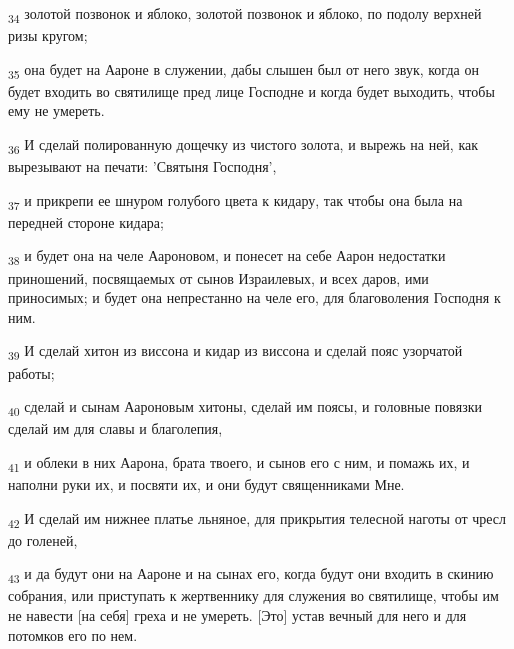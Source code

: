 \begin{tcolorbox}
\textsubscript{34} золотой позвонок и яблоко, золотой позвонок и яблоко, по подолу верхней ризы кругом;
\end{tcolorbox}
\begin{tcolorbox}
\textsubscript{35} она будет на Аароне в служении, дабы слышен был от него звук, когда он будет входить во святилище пред лице Господне и когда будет выходить, чтобы ему не умереть.
\end{tcolorbox}
\begin{tcolorbox}
\textsubscript{36} И сделай полированную дощечку из чистого золота, и вырежь на ней, как вырезывают на печати: 'Святыня Господня',
\end{tcolorbox}
\begin{tcolorbox}
\textsubscript{37} и прикрепи ее шнуром голубого цвета к кидару, так чтобы она была на передней стороне кидара;
\end{tcolorbox}
\begin{tcolorbox}
\textsubscript{38} и будет она на челе Аароновом, и понесет на себе Аарон недостатки приношений, посвящаемых от сынов Израилевых, и всех даров, ими приносимых; и будет она непрестанно на челе его, для благоволения Господня к ним.
\end{tcolorbox}
\begin{tcolorbox}
\textsubscript{39} И сделай хитон из виссона и кидар из виссона и сделай пояс узорчатой работы;
\end{tcolorbox}
\begin{tcolorbox}
\textsubscript{40} сделай и сынам Аароновым хитоны, сделай им поясы, и головные повязки сделай им для славы и благолепия,
\end{tcolorbox}
\begin{tcolorbox}
\textsubscript{41} и облеки в них Аарона, брата твоего, и сынов его с ним, и помажь их, и наполни руки их, и посвяти их, и они будут священниками Мне.
\end{tcolorbox}
\begin{tcolorbox}
\textsubscript{42} И сделай им нижнее платье льняное, для прикрытия телесной наготы от чресл до голеней,
\end{tcolorbox}
\begin{tcolorbox}
\textsubscript{43} и да будут они на Аароне и на сынах его, когда будут они входить в скинию собрания, или приступать к жертвеннику для служения во святилище, чтобы им не навести [на себя] греха и не умереть. [Это] устав вечный для него и для потомков его по нем.
\end{tcolorbox}
